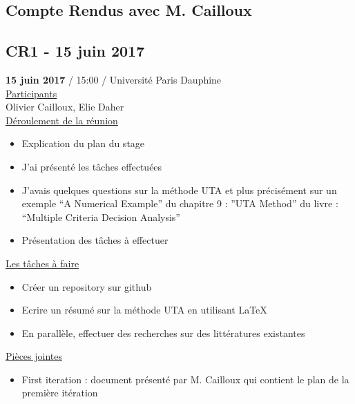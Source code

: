 \documentclass{report}
\begin{document}
\listoffigures
{}

\begin{appendices}

\chapter{Compte Rendus avec M. Cailloux}
\section{CR1 - 15 juin 2017}
\textbf{15 juin 2017} / 15:00 / Université Paris Dauphine \\

\underline{Participants} \\

Olivier Cailloux, Elie Daher\\

\underline{Déroulement de la réunion}\\
\begin{itemize}
	\item Explication du plan du stage
	\item J’ai présenté les tâches effectuées
	\item J’avais quelques questions sur la méthode UTA et plus précisément sur un exemple “A Numerical Example” du chapitre 9 : ”UTA Method” du livre : “Multiple Criteria Decision Analysis”
	\item Présentation des tâches à effectuer\\
\end{itemize}

\underline{Les tâches à faire} \\
\begin{itemize}
	\item Créer un repository sur github
	\item Ecrire un résumé sur la méthode UTA en utilisant LaTeX
	\item En parallèle, effectuer des recherches sur des littératures existantes\\
\end{itemize}

\underline{Pièces jointes} \\
\begin{itemize}
	\item First iteration : document présenté par M. Cailloux qui contient le plan de la première itération\\
\end{itemize}


\end{appendices}
\end{document}
